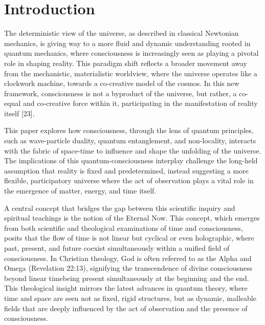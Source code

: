 \chapter{Introduction}

The deterministic view of the universe, as described in classical Newtonian mechanics, is giving way to a more fluid and dynamic understanding rooted in quantum mechanics, where consciousness is increasingly seen as playing a pivotal role in shaping reality. This paradigm shift reflects a broader movement away from the mechanistic, materialistic worldview, where the universe operates like a clockwork machine, towards a co-creative model of the cosmos. In this new framework, consciousness is not a byproduct of the universe, but rather, a co-equal and co-creative force within it, participating in the manifestation of reality itself [23].


This paper explores how consciousness, through the lens of quantum principles, such as wave-particle duality, quantum entanglement, and non-locality, interacts with the fabric of space-time to influence and shape the unfolding of the universe. The implications of this quantum-consciousness interplay challenge the long-held assumption that reality is fixed and predetermined, instead suggesting a more flexible, participatory universe where the act of observation plays a vital role in the emergence of matter, energy, and time itself.


A central concept that bridges the gap between this scientific inquiry and spiritual teachings is the notion of the Eternal Now. This concept, which emerges from both scientific and theological examinations of time and consciousness, posits that the flow of time is not linear but cyclical or even holographic, where past, present, and future coexist simultaneously within a unified field of consciousness. In Christian theology, God is often referred to as the Alpha and Omega (Revelation 22:13), signifying the transcendence of divine consciousness beyond linear timebeing present simultaneously at the beginning and the end. This theological insight mirrors the latest advances in quantum theory, where time and space are seen not as fixed, rigid structures, but as dynamic, malleable fields that are deeply influenced by the act of observation and the presence of consciousness.

